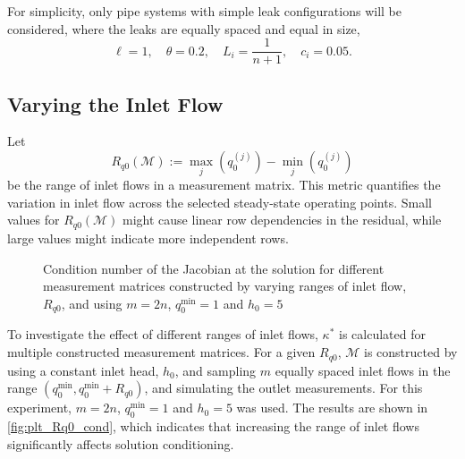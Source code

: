 For simplicity, only pipe systems with simple leak configurations will be considered, where the leaks are equally spaced and equal in size,
\begin{equation*}
    \ell=1, \quad \theta =0.2, \quad L_i = \frac{1}{n+1}, \quad c_i = 0.05.
\end{equation*}

\subsection{Varying the Inlet Flow}

Let
\begin{equation*}
    R_{q0}(\mathcal{M}):= \underset{j}{\max}(q_0^{(j)})-\underset{j}{\min}(q_0^{(j)})
\end{equation*}
be the range of inlet flows in a measurement matrix. This metric quantifies the variation in inlet flow across the selected steady-state operating points. Small values for $R_{q0}(\mathcal{M})$ might cause linear row dependencies in the residual, while large values might indicate more independent rows.\\

\begin{figure}[ht]
    \centering
    
    \caption[Condition number at the solution for different ranges of inlet flow]{Condition number of the Jacobian at the solution for different measurement matrices constructed by varying ranges of inlet flow, $R_{q0}$, and using $m=2n$, $q_0^{\min}=1$ and $h_0=5$}
    \label{fig:plt_Rq0_cond}
\end{figure}

To investigate the effect of different ranges of inlet flows, $\kappa^*$ is calculated for multiple constructed measurement matrices. For a given $R_{q0}$, $\mathcal{M}$ is constructed by using a constant inlet head, $h_0$, and sampling $m$ equally spaced inlet flows in the range $(q_0^{\min},q_0^{\min}+R_{q0})$, and simulating the outlet measurements. For this experiment, $m=2n$, $q_0^{\min}=1$ and $h_0=5$ was used. The results are shown in \autoref{fig:plt_Rq0_cond}, which indicates that increasing the range of inlet flows significantly affects solution conditioning.


